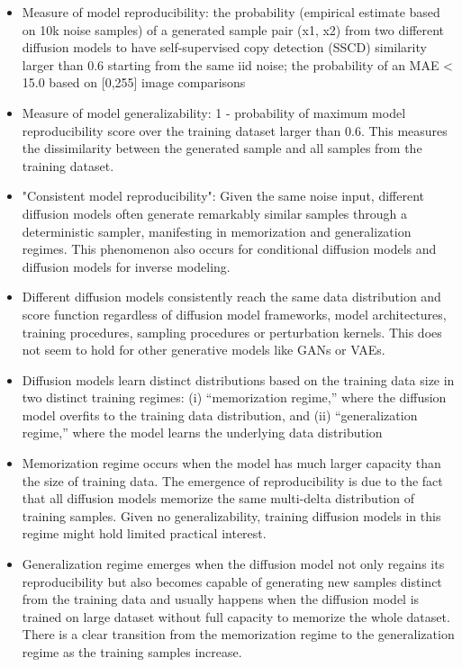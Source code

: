 \documentclass{article}
\begin{document}
\begin{itemize}
    \item Measure of model reproducibility: the probability (empirical estimate based on 10k noise samples) of a generated sample pair (x1, x2) from two different diffusion models to have self-supervised copy detection (SSCD) similarity larger than 0.6 starting from the same iid noise; the probability of an MAE < 15.0 based on [0,255] image comparisons
    \item Measure of model generalizability: 1 - probability of maximum model reproducibility score over the training dataset larger than 0.6. This measures the dissimilarity between the generated sample and all samples from the training dataset.
    \item "Consistent model reproducibility": Given the same noise input, different diffusion models often generate remarkably similar samples through a deterministic sampler, manifesting in memorization and generalization regimes. This phenomenon also occurs for conditional diffusion models and diffusion models for inverse modeling.
    \item Different diffusion models consistently reach the same data distribution and score function regardless of diffusion model frameworks, model architectures, training procedures, sampling procedures or perturbation kernels. This does not seem to hold for other generative models like GANs or VAEs.
    \item Diffusion models learn distinct distributions based on the training data size in two distinct training regimes: (i) “memorization regime,” where the diffusion model overfits to the training data distribution, and (ii) “generalization regime,” where the model learns the underlying data distribution
    \item Memorization regime occurs when the model has much larger capacity than the size of training data. The emergence of reproducibility is due to the fact that all diffusion models memorize the same multi-delta distribution of training samples. Given no generalizability, training diffusion models in this regime might hold limited practical interest.
    \item Generalization regime emerges when the diffusion model not only regains its reproducibility but also becomes capable of generating new samples distinct from the training data and usually happens when the diffusion model is trained on large dataset without full capacity to memorize the whole dataset. There is a clear transition from the memorization regime to the generalization regime as the training samples increase.

\end{itemize}
\end{document}

